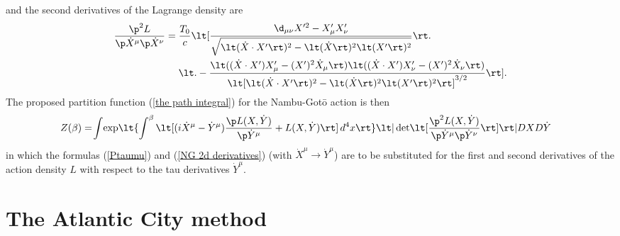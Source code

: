 \documentclass[prd,preprint,floatfix,showpacs]{revtex4-1}
\begin{document}
\eeq
and the second derivatives 
of the Lagrange density are
\begin{equation}
   \begin{split}
\frac{\p^2 L}{\p \dot X^\mu \p \dot X^\nu}
= {}& \frac{T_0}{c} \lt[
\frac{\d_{\mu \nu} X'^2 - X'_\mu X'_\nu}
{ \sqrt{ \lt( \dot X \cdot X' \rt)^2
- \lt( \dot X \rt)^2 \lt( X' \rt)^2 } } \rt. \\
{}& \lt.
- \frac{ \lt( (\dot X \cdot X') X'_\mu 
- (X')^2 \dot X_\mu \rt)
\lt( (\dot X \cdot X') X'_\nu 
- (X')^2 \dot X_\nu \rt) }
{ \lt[ \lt( \dot X \cdot X' \rt)^2
- \lt( \dot X \rt)^2 \lt( X' \rt)^2 \rt]^{3/2} }
\rt]  .
\label {NG 2d derivatives}
   \end{split}
\end{equation}
The proposed partition function
(\ref {the path integral}) for
the Nambu-Got{\={o}} action is then
\begin{equation}
   \begin{split}
Z(\beta) = {}&
\! \! \int \! \exp \! \lt\{\int^\beta \lt[
( i \dot X^\mu
- \dot Y^\mu ) \frac{ \p  L(X, \dot Y) }
{ \p \dot Y^\mu }
+ L(X, \dot Y) \rt]
\, d^4x \rt\}   
\lt| \det \! \lt[ \frac{ \p^2  L(X, \dot Y) }
{ \p \dot Y^\mu \p \dot Y^\nu }  \rt] \rt|
DX D\dot Y  
\label {the path integral with chi's for NG}
   \end{split}
\end{equation}
in which the formulas (\ref {Ptaumu})
and (\ref {NG 2d derivatives}) 
(with \( \dot X^\mu \to \dot Y^\mu \)) are to be
substituted for the first and second
derivatives of the action density \( L \)
with respect to the tau derivatives
\( \dot Y^\mu \)\@.



\section{The Atlantic City method
\label {The Atlantic City method}}
\end{document}
